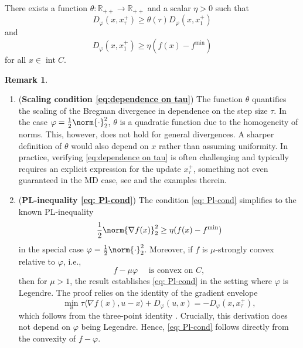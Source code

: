 \documentclass[11pt,reqno]{amsart}
\numberwithin{equation}{section}
\numberwithin{figure}{section}
\theoremstyle{plain}
\theoremstyle{definition}
\newtheorem{remark}[theorem]{Remark}
\newenvironment{assumptionp}[1]{
  \renewcommand\theassumptionalt{#1}
  \assumptionalt
}{\endassumptionalt}
\newcommand{\R}{\mathbb{R}}
\newcommand{\la}{\langle}
\newcommand{\ra}{\rangle}
\newcommand{\vphi}{\varphi}
\newcommand{\df}{\nabla f}
\DeclareMathOperator{\intr}{int}
\begin{document}
\begin{assumptionp}{B}[Polyak-\L{}ojasiewicz-like condition]\label{ass:PL-with-L-dependence}
    There exists a function $\theta: \R_{++} \to \R_{++}$ and a scalar $\eta > 0$ such that
    \begin{equation} \label{eq:dependence on tau}
        D_\vphi(x,x_\tau^+) \geq \theta(\tau) D_\vphi(x, x_1^+)
    \end{equation}
    and 
    \begin{equation} \label{eq: Pl-cond}
        D_\vphi(x, x^+_1) \geq \eta (f(x) - f^{\min})
    \end{equation}
    for all $x \in \intr C$.
\end{assumptionp}

\begin{remark}      
\begin{enumerate}[label=(\alph*), leftmargin=*, align=left, itemsep=3pt]
    \item (\textbf{Scaling condition \eqref{eq:dependence on tau}})  
    The function $\theta$ quantifies the scaling of the Bregman divergence in dependence on the step size $\tau$. In the case $\vphi = \frac{1}{2}\norm{\cdot}^2_2$, $\theta$ is a quadratic function due to the homogeneity of norms. This, however, does not hold for general divergences.  
    A sharper definition of $\theta$ would also depend on $x$ rather than assuming uniformity. In practice, verifying \eqref{eq:dependence on tau} is often challenging and typically requires an explicit expression for the update $x_\tau^+$, something not even guaranteed in the MD case, see \cite{Bauschke:19} and the examples therein.

    \item (\textbf{PL-inequality \eqref{eq: Pl-cond}})  
    The condition \eqref{eq: Pl-cond} simplifies to the known PL-inequality  
    \begin{equation}
        \frac{1}{2} \norm{\df(x)}_2^2 \geq \eta (f(x) - f^{\min})
    \end{equation}
    in the special case $\vphi = \frac{1}{2}\norm{\cdot}^2_2$.  
    Moreover, if $f$ is $\mu$-strongly convex relative to $\vphi$, i.e.,  
    \begin{equation}
        f - \mu \vphi \quad \text{ is convex on } C,
    \end{equation}
    then for $\mu > 1$, the result \cite[Lemma 3.3]{Bauschke:19} establishes \eqref{eq: Pl-cond} in the setting where $\vphi$ is Legendre. The proof relies on the identity of the gradient envelope
    \begin{equation}
        \min_u \tau \la \df(x), u-x \ra + D_\vphi(u,x) = - D_\vphi(x, x_\tau^+),
    \end{equation}
    which follows from the three-point identity \cite{Chen_Teboulle_1993}. Crucially, this derivation does not depend on $\vphi$ being Legendre. Hence, \eqref{eq: Pl-cond} follows directly from the convexity of $f-\vphi$.


\end{enumerate}
\end{remark}
\end{document}
